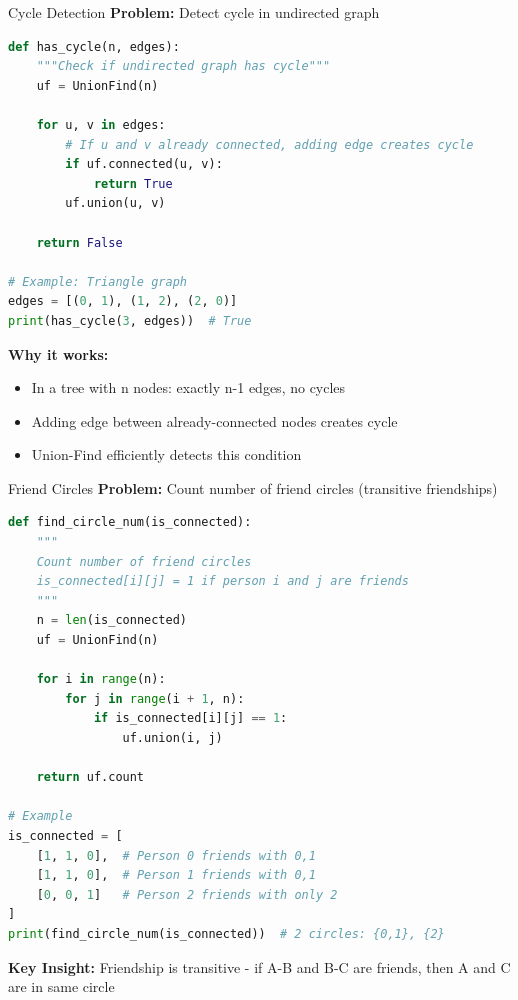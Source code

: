\documentclass[aspectratio=169]{beamer}
\begin{document}
\begin{frame}[fragile]{Cycle Detection}
  \textbf{Problem:} Detect cycle in undirected graph

  \begin{lstlisting}[language=Python, basicstyle=\ttfamily\footnotesize]
def has_cycle(n, edges):
    """Check if undirected graph has cycle"""
    uf = UnionFind(n)

    for u, v in edges:
        # If u and v already connected, adding edge creates cycle
        if uf.connected(u, v):
            return True
        uf.union(u, v)

    return False

# Example: Triangle graph
edges = [(0, 1), (1, 2), (2, 0)]
print(has_cycle(3, edges))  # True
  \end{lstlisting}

  \vspace{0.5cm}
  \textbf{Why it works:}
  \begin{itemize}
    \item In a tree with n nodes: exactly n-1 edges, no cycles
    \item Adding edge between already-connected nodes creates cycle
    \item Union-Find efficiently detects this condition
  \end{itemize}
\end{frame}

\begin{frame}[fragile]{Friend Circles}
  \textbf{Problem:} Count number of friend circles (transitive friendships)

  \begin{lstlisting}[language=Python, basicstyle=\ttfamily\footnotesize]
def find_circle_num(is_connected):
    """
    Count number of friend circles
    is_connected[i][j] = 1 if person i and j are friends
    """
    n = len(is_connected)
    uf = UnionFind(n)

    for i in range(n):
        for j in range(i + 1, n):
            if is_connected[i][j] == 1:
                uf.union(i, j)

    return uf.count

# Example
is_connected = [
    [1, 1, 0],  # Person 0 friends with 0,1
    [1, 1, 0],  # Person 1 friends with 0,1
    [0, 0, 1]   # Person 2 friends with only 2
]
print(find_circle_num(is_connected))  # 2 circles: {0,1}, {2}
  \end{lstlisting}

  \textbf{Key Insight:} Friendship is transitive - if A-B and B-C are friends, then A and C are in same circle
\end{frame}
\end{document}
